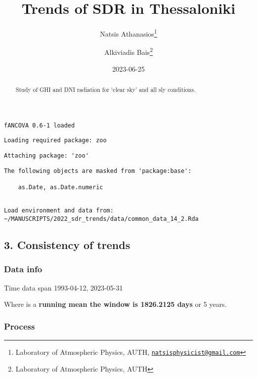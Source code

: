 \documentclass[
  10pt,
  a4paper,oneside]{article}
\title{Trends of SDR in Thessaloniki}
\author{Natsis Athanasios\footnote{Laboratory of Atmospheric Physics, AUTH, \href{mailto:natsisphysicist@gmail.com}{\nolinkurl{natsisphysicist@gmail.com}}} \and Alkiviadis Bais\footnote{Laboratory of Atmospheric Physics, AUTH}}
\date{2023-06-25}
\begin{document}
\maketitle
\begin{abstract}
Study of GHI and DNI radiation for `clear sky' and all sly conditions.
\end{abstract}

{
\hypersetup{linkcolor=}
\setcounter{tocdepth}{4}
\tableofcontents
}
\begin{verbatim}
fANCOVA 0.6-1 loaded
\end{verbatim}

\begin{verbatim}
Loading required package: zoo
\end{verbatim}

\begin{verbatim}
Attaching package: 'zoo'
\end{verbatim}

\begin{verbatim}
The following objects are masked from 'package:base':

    as.Date, as.Date.numeric
\end{verbatim}

\begin{verbatim}

Load environment and data from:  ~/MANUSCRIPTS/2022_sdr_trends/data/common_data_14_2.Rda 
\end{verbatim}

\hypertarget{consistency-of-trends}{%
\subsection{3. Consistency of trends}\label{consistency-of-trends}}

\hypertarget{data-info}{%
\subsubsection{Data info}\label{data-info}}

Time data span 1993-04-12, 2023-05-31

Where is a \textbf{running mean the window is 1826.2125 days} or
5 years.

\hypertarget{process}{%
\subsubsection{Process}\label{process}}

\newpage
\FloatBarrier
\end{document}
